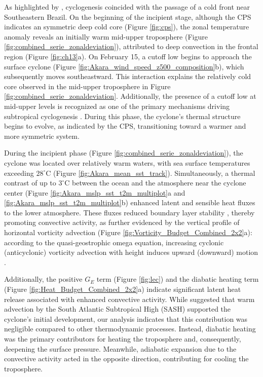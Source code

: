 \documentclass[pdflatex,sn-chicago]{sn-jnl}%
\theoremstyle{plain}
\theoremstyle{definition}
\theoremstyle{remark}
\theoremstyle{definition}
\begin{document}
As highlighted by \citet{reboita2024assessment}, cyclogenesis coincided with the passage of a cold front near Southeastern Brazil. On the beginning of the incipient stage, although the CPS indicates an symmetric deep cold core (Figure \ref{fig:cps}), the zonal temperature anomaly reveals an initially warm mid-upper troposphere (Figure \ref{fig:combined_serie_zonaldeviation}), attributed to deep convection in the frontal region (Figure \ref{fig:ch13}a). On February 15, a cutoff low begins to approach the surface cyclone (Figure \ref{fig:Akara_wind_speed_z500_composition}b), which subsequently moves southeastward. This interaction explains the relatively cold core observed in the mid-upper troposphere in Figure \ref{fig:combined_serie_zonaldeviation}. Additionally, the presence of a cutoff low at mid-upper levels is recognized as one of the primary mechanisms driving subtropical cyclogenesis \citep{da2019subtropical}. During this phase, the cyclone's thermal structure begins to evolve, as indicated by the CPS, transitioning toward a warmer and more symmetric system.

During the incipient phase (Figure \ref{fig:combined_serie_zonaldeviation}), the cyclone was located over relatively warm waters, with sea surface temperatures exceeding $28^{\circ}\text{C}$ (Figure \ref{fig:Akara_mean_sst_track}). Simultaneously, a thermal contrast of up to $3^{\circ}\text{C}$ between the ocean and the atmosphere near the cyclone center (Figure \ref{fig:Akara_mslp_sst_t2m_multiplot}a and \ref{fig:Akara_mslp_sst_t2m_multiplot}b) enhanced latent and sensible heat fluxes to the lower atmosphere. These fluxes reduced boundary layer stability \citep[e.g.,][]{pezzi2009multiyear,pezzi2021oceanic}, thereby promoting convective activity, as further evidenced by the vertical profile of horizontal vorticity advection (Figure \ref{fig:Vorticity_Budget_Combined_2x2}a): according to the quasi-geostrophic omega equation, increasing cyclonic (anticyclonic) vorticity advection with height induces upward (downward) motion \citep{trenberth1978interpretation,maddox1982examination}. 

Additionally, the positive $G_E$ term (Figure \ref{fig:lec}) and the diabatic heating term (Figure \ref{fig:Heat_Budget_Combined_2x2}a) indicate significant latent heat release associated with enhanced convective activity. While \citet{reboita2024assessment} suggested that warm advection by the South Atlantic Subtropical High (SASH) supported the cyclone's initial development, our analysis indicates that this contribution was negligible compared to other thermodynamic processes. Instead, diabatic heating was the primary contributors for heating the troposphere and, consequently, deepening the surface pressure. Meanwhile, adiabatic expansion due to the convective activity acted in the opposite direction, contributing for cooling the troposphere.  
\end{document}
